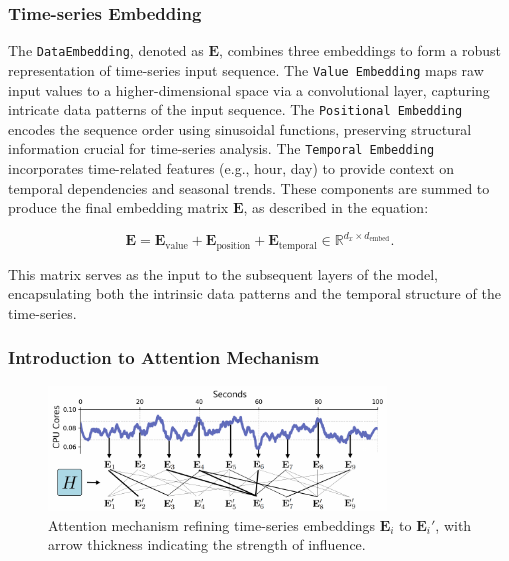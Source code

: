 \documentclass{ieeetmlcn}
\begin{document}
\subsubsection*{Time-series Embedding}

The \texttt{DataEmbedding}, denoted as $\mathbf{E}$, combines three embeddings to form a robust representation of time-series input sequence. The \texttt{Value Embedding} \cite{yue2022ts2vec} maps raw input values to a higher-dimensional space via a convolutional layer, capturing intricate data patterns of the input sequence. The \texttt{Positional Embedding} \cite{kazemnejad2024impact} encodes the sequence order using sinusoidal functions, preserving structural information crucial for time-series analysis. The \texttt{Temporal Embedding} \cite{liu2023spatio} incorporates time-related features (e.g., hour, day) to provide context on temporal dependencies and seasonal trends. These components are summed to produce the final embedding matrix $\mathbf{E}$, as described in the equation:

\begin{equation}
\mathbf{E} = \mathbf{E}_{\text{value}} + \mathbf{E}_{\text{position}} + \mathbf{E}_{\text{temporal}} \in \mathbb{R}^{d_x \times d_{\text{embed}}}.
\end{equation}

This matrix serves as the input to the subsequent layers of the model, encapsulating both the intrinsic data patterns and the temporal structure of the time-series.

\subsubsection*{Introduction to Attention Mechanism}

\begin{figure}\centering
\centering
\centering\includegraphics[width=0.8\textwidth]{img/attention_goal.png}
\caption{Attention mechanism refining time-series embeddings $\mathbf{E}_i$ to $\mathbf{E}_i'$, with arrow thickness indicating the strength of influence.}
\label{fig:attention_goal}
\end{figure}
\end{document}
